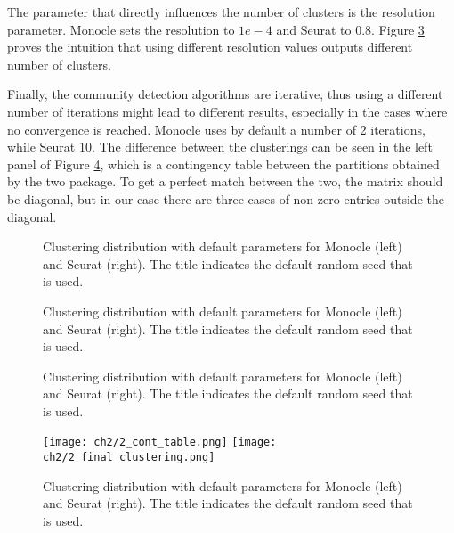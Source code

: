 The parameter that directly influences the number of clusters is the resolution parameter. Monocle sets the resolution to $1e-4$ and Seurat to $0.8$. Figure \ref{fig:s4-m3-res} proves the intuition that using different resolution values outputs different number of clusters.

Finally, the community detection algorithms are iterative, thus using a different number of iterations might lead to different results, especially in the cases where no convergence is reached. Monocle uses by default a number of 2 iterations, while Seurat 10. The difference between the clusterings can be seen in the left panel of Figure \ref{fig:s4-m3-cont}, which is a contingency table between the partitions obtained by the two package. To get a perfect match between the two, the matrix should be diagonal, but in our case there are three cases of non-zero entries outside the diagonal.

\begin{figure}[H]
    \centering
    \caption{\label{fig:s4-m3-graph-alg}Clustering distribution with default parameters for Monocle (left) and Seurat (right). The title indicates the default random seed that is used.}
\end{figure}

\begin{figure}[H]
    \centering
    \caption{\label{fig:s4-m3-quality}Clustering distribution with default parameters for Monocle (left) and Seurat (right). The title indicates the default random seed that is used.}
\end{figure}

\begin{figure}[H]
    \centering
    \caption{\label{fig:s4-m3-res}Clustering distribution with default parameters for Monocle (left) and Seurat (right). The title indicates the default random seed that is used.}
\end{figure}


\begin{figure}[H]
    \centering
    \texttt{[image: ch2/2\_cont\_table.png]}
    \texttt{[image: ch2/2\_final\_clustering.png]}
    \caption{\label{fig:s4-m3-cont}Clustering distribution with default parameters for Monocle (left) and Seurat (right). The title indicates the default random seed that is used.}
\end{figure}

